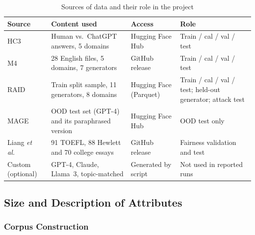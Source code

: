 \begin{table}[H]
\caption{Sources of data and their role in the project}
\label{tab:datasources}
\centering
\small
\begin{tabularx}{\textwidth}{|p{2.6cm}|L|p{2.5cm}|p{3.2cm}|}
\hline
\textbf{Source} & \textbf{Content used} & \textbf{Access} & \textbf{Role} \\ \hline
HC3~\cite{guo2023hc3} & Human vs.\ ChatGPT answers, 5 domains & Hugging Face Hub & Train / cal / val / test \\ \hline
M4~\cite{wang2024m4} & 28 English files, 5 domains, 7 generators & GitHub release & Train / cal / val / test \\ \hline
RAID~\cite{dugan2024raid} & Train split sample, 11 generators, 8 domains & Hugging Face (Parquet) & Train / cal / val / test; held-out generator; attack test \\ \hline
MAGE~\cite{li2024mage} & OOD test set (GPT-4) and its paraphrased version & Hugging Face Hub & OOD test only \\ \hline
Liang \textit{et al.}~\cite{liang2023biased} & 91 TOEFL, 88 Hewlett and 70 college essays & GitHub release & Fairness validation and test \\ \hline
Custom (optional) & GPT-4, Claude, Llama~3, topic-matched & Generated by script & Not used in reported runs \\ \hline
\end{tabularx}
\end{table}

\subsection{Size and Description of Attributes}

\subsubsection{Corpus Construction}

